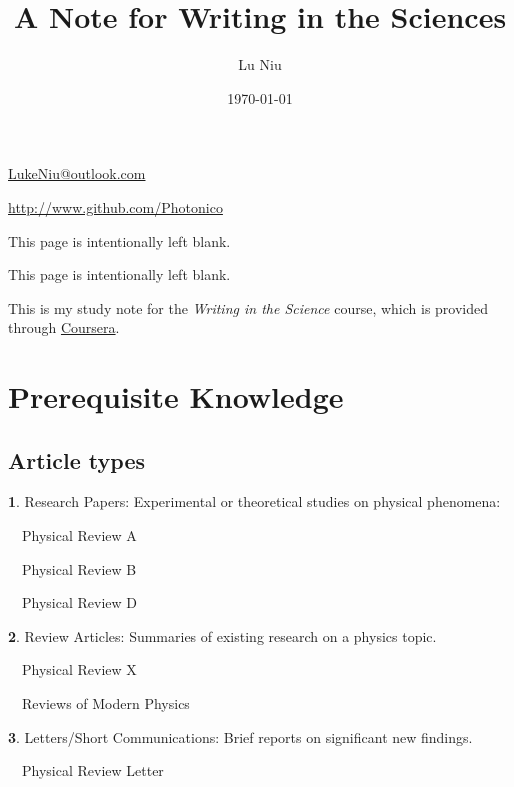 \documentclass[a4paper, 12pt]{article}
\title{\textbf{A Note for Writing in the Sciences}}
\author{Lu Niu}
\date{\today}
\begin{document}
\maketitle
\vspace{\fill}
\begin{center}
    \par\href{mailto:LukeNiu@outlook.com}{LukeNiu@outlook.com}
    \par\href{http://www.github.com/Photonico}{http://www.github.com/Photonico}
\end{center}
\thispagestyle{empty}

\newpage
This page is intentionally left blank.
\thispagestyle{empty}

\newpage
\tableofcontents\thispagestyle{empty}

\newpage
This page is intentionally left blank.
\thispagestyle{empty}

\newpage
{}

This is my study note for the \textit{Writing in the Science} course,
which is provided through \href{https://www.coursera.org/learn/sciwrite}{Coursera}.

\section*{Prerequisite Knowledge}

\subsection{Article types}

\vspace{4pt}\textbf{1}. Research Papers: Experimental or theoretical studies on physical phenomena:
\par\ \textopenbullet\ Physical Review A
\par\ \textopenbullet\ Physical Review B
\par\ \textopenbullet\ Physical Review D

\vspace{4pt}\textbf{2}. Review Articles: Summaries of existing research on a physics topic.
\par\ \textopenbullet\ Physical Review X
\par\ \textopenbullet\ Reviews of Modern Physics

\vspace{4pt}\textbf{3}. Letters/Short Communications: Brief reports on significant new findings.
\par\ \textopenbullet\ Physical Review Letter
\end{document}
